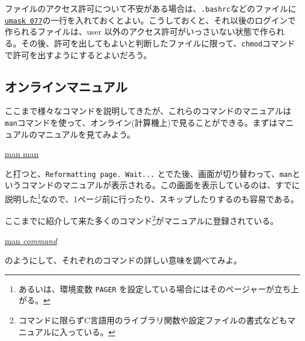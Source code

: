 ファイルのアクセス許可について不安がある場合は、{\tt .bashrc}などのファイルに
\underline{\tt umask 077}の一行を入れておくとよい。こうしておくと、それ以後のログインで作られるファイルは、user 以外のアクセス許可がいっさいない状態で作られる。その後、許可を出してもよいと判断したファイルに限って、{\tt chmod}コマンドで許可を出すようにするとよいだろう。

\subsection{オンラインマニュアル}
ここまで様々なコマンドを説明してきたが、これらのコマンドのマニュアルは{\tt man}コマンドを使って、オンライン(計算機上)で見ることができる。まずはマニュアルのマニュアルを見てみよう。
\begin{commandline2}
\prompt \underline{man man}
\end{commandline2} \noindent
と打つと、{\tt Reformatting page.  Wait...} とでた後、画面が切り替わって、{\tt man}というコマンドのマニュアルが表示される。この画面を表示しているのは、すでに説明した{\tt \pager}\footnote{あるいは、環境変数 {\tt PAGER} を設定している場合にはそのページャーが立ち上がる。}なので、1ページ前に行ったり、スキップしたりするのも容易である。

ここまでに紹介して来た多くのコマンド\footnote{コマンドに限らずC言語用のライブラリ関数や設定ファイルの書式などもマニュアルに入っている。}がマニュアルに登録されている。
\begin{commandline2}
\prompt \underline{man {\it command}}
\end{commandline2} \noindent
のようにして、それぞれのコマンドの詳しい意味を調べてみよ。

